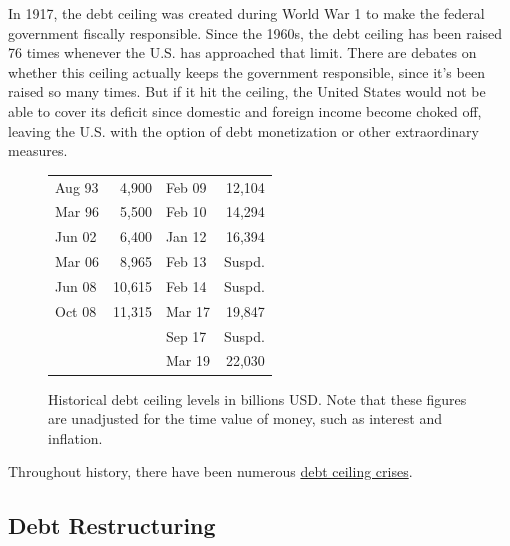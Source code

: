 \documentclass{article}
\begin{document}
      In 1917, the debt ceiling was created during World War 1 to make the federal government fiscally responsible. Since the 1960s, the debt ceiling has been raised 76 times whenever the U.S. has approached that limit. There are debates on whether this ceiling actually keeps the government responsible, since it's been raised so many times. But if it hit the ceiling, the United States would not be able to cover its deficit since domestic and foreign income become choked off, leaving the U.S. with the option of debt monetization or other extraordinary measures.

      \begin{figure}[H]
        \begin{table}[H]
          \begin{tabular}{|lr|lr|}
          \hline
          Aug 93 & 4,900  & Feb 09 & 12,104 \\
          Mar 96 & 5,500  & Feb 10 & 14,294 \\
          Jun 02 & 6,400  & Jan 12 & 16,394 \\
          Mar 06 & 8,965  & Feb 13 & Suspd. \\
          Jun 08 & 10,615 & Feb 14 & Suspd. \\
          Oct 08 & 11,315 & Mar 17 & 19,847 \\
          &        & Sep 17 & Suspd. \\
          &        & Mar 19 & 22,030 \\
          \hline
          \end{tabular}
        \end{table}
        \caption{Historical debt ceiling levels in billions USD. Note that these figures are unadjusted for the time value of money, such as interest and inflation.} 
        \label{fig:debt_ceilings}
      \end{figure}
      
      Throughout history, there have been numerous \href{https://en.wikipedia.org/wiki/History_of_the_United_States_debt_ceiling#Number_of_requests_for_increase}{debt ceiling crises}. 

      \begin{example}
        \label{ex:1995-debt-ceiling-crisis}
        
      \end{example}

      \begin{example}
        \label{ex:2011-debt-ceiling-crisis}
        
      \end{example}

      \begin{example}
        \label{ex:2013-debt-ceiling-crisis}
        
      \end{example}

      \begin{example}
        \label{ex:2021-debt-ceiling-crisis}
        
      \end{example}

  \subsection{Debt Restructuring}
\end{document}
